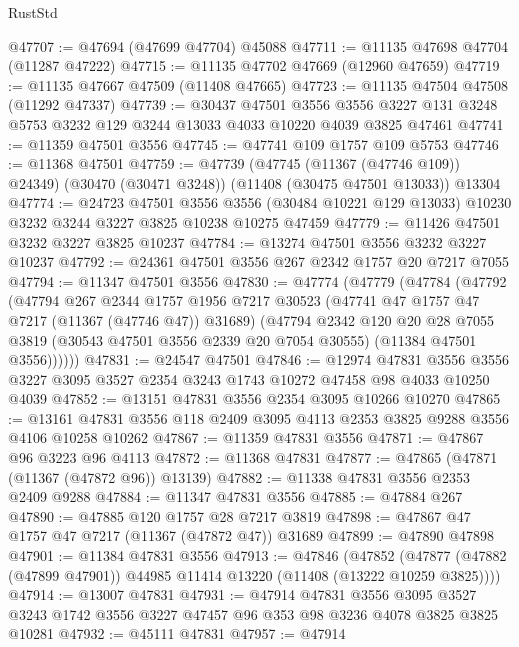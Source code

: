 \begin{lexlean}{RustStd}
\begin{coremodule}
@47707 := @47694 (@47699 @47704) @45088
@47711 := @11135 @47698 @47704 (@11287 @47222)
@47715 := @11135 @47702 @47669 (@12960 @47659)
@47719 := @11135 @47667 @47509 (@11408 @47665)
@47723 := @11135 @47504 @47508 (@11292 @47337)
@47739 := @30437
    @47501
    @3556
    @3556
    @3227
    @131
    @3248
    @5753
    @3232
    @129
    @3244
    @13033
    @4033
    @10220
    @4039
    @3825
    @47461
@47741 := @11359 @47501 @3556
@47745 := @47741 @109 @1757 @109 @5753
@47746 := @11368 @47501
@47759 := @47739
    (@47745 (@11367 (@47746 @109)) @24349)
    (@30470 (@30471 @3248))
    (@11408 (@30475 @47501 @13033))
    @13304
@47774 := @24723
    @47501
    @3556
    @3556
    (@30484 @10221 @129 @13033)
    @10230
    @3232
    @3244
    @3227
    @3825
    @10238
    @10275
    @47459
@47779 := @11426 @47501 @3232 @3227 @3825 @10237
@47784 := @13274 @47501 @3556 @3232 @3227 @10237
@47792 := @24361 @47501 @3556 @267 @2342 @1757 @20 @7217 @7055
@47794 := @11347 @47501 @3556
@47830 := @47774
    (@47779
      (@47784
        (@47792
          (@47794
            @267
            @2344
            @1757
            @1956
            @7217
            @30523
            (@47741 @47 @1757 @47 @7217 (@11367 (@47746 @47)) @31689)
            (@47794
              @2342
              @120
              @20
              @28
              @7055
              @3819
              (@30543 @47501 @3556 @2339 @20 @7054 @30555)
              (@11384 @47501 @3556))))))
@47831 := @24547 @47501
@47846 := @12974
    @47831
    @3556
    @3556
    @3227
    @3095
    @3527
    @2354
    @3243
    @1743
    @10272
    @47458
    @98
    @4033
    @10250
    @4039
@47852 := @13151 @47831 @3556 @2354 @3095 @10266 @10270
@47865 := @13161 @47831 @3556 @118 @2409 @3095 @4113 @2353 @3825 @9288 @3556 @4106 @10258 @10262
@47867 := @11359 @47831 @3556
@47871 := @47867 @96 @3223 @96 @4113
@47872 := @11368 @47831
@47877 := @47865 (@47871 (@11367 (@47872 @96)) @13139)
@47882 := @11338 @47831 @3556 @2353 @2409 @9288
@47884 := @11347 @47831 @3556
@47885 := @47884 @267
@47890 := @47885 @120 @1757 @28 @7217 @3819
@47898 := @47867 @47 @1757 @47 @7217 (@11367 (@47872 @47)) @31689
@47899 := @47890 @47898
@47901 := @11384 @47831 @3556
@47913 := @47846
    (@47852 (@47877 (@47882 (@47899 @47901)) @44985 @11414 @13220 (@11408 (@13222 @10259 @3825))))
@47914 := @13007 @47831
@47931 := @47914
    @47831
    @3556
    @3095
    @3527
    @3243
    @1742
    @3556
    @3227
    @47457
    @96
    @353
    @98
    @3236
    @4078
    @3825
    @3825
    @10281
@47932 := @45111 @47831
@47957 := @47914

\end{coremodule}
\end{lexlean}
